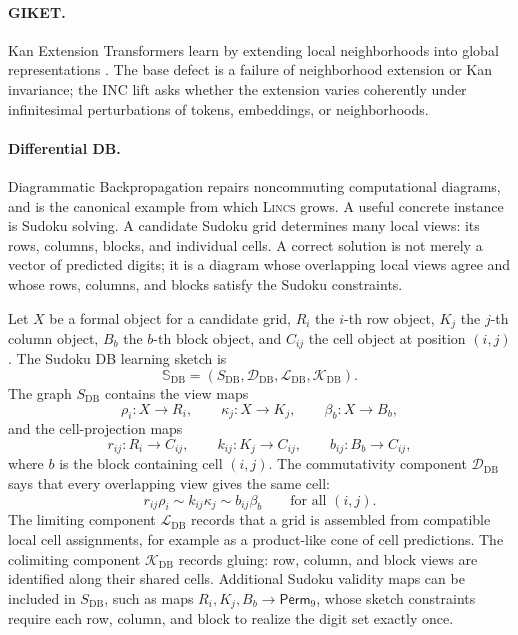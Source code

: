 \documentclass{article}
\begin{document}
\paragraph{GIKET.}
Kan Extension Transformers learn by extending local neighborhoods into global representations \citep{mahadevan2026ket}. The base defect is a failure of neighborhood extension or Kan invariance; the INC lift asks whether the extension varies coherently under infinitesimal perturbations of tokens, embeddings, or neighborhoods.

\paragraph{Differential DB.}
Diagrammatic Backpropagation repairs noncommuting computational diagrams, and is the canonical example from which \textsc{Lincs}   grows. A useful concrete instance is Sudoku solving. A candidate Sudoku grid determines many local views: its rows, columns, blocks, and individual cells. A correct solution is not merely a vector of predicted digits; it is a diagram whose overlapping local views agree and whose rows, columns, and blocks satisfy the Sudoku constraints.

Let \(X\) be a formal object for a candidate grid, \(R_i\) the \(i\)-th row object, \(K_j\) the \(j\)-th column object, \(B_b\) the \(b\)-th block object, and \(C_{ij}\) the cell object at position \((i,j)\). The Sudoku DB learning sketch is
\[
\mathbb S_{\mathrm{DB}}
  =
  (S_{\mathrm{DB}},
   \mathcal D_{\mathrm{DB}},
   \mathcal L_{\mathrm{DB}},
   \mathcal K_{\mathrm{DB}}).
\]
The graph \(S_{\mathrm{DB}}\) contains the view maps
\[
\rho_i:X\to R_i,\qquad
\kappa_j:X\to K_j,\qquad
\beta_b:X\to B_b,
\]
and the cell-projection maps
\[
r_{ij}:R_i\to C_{ij},\qquad
k_{ij}:K_j\to C_{ij},\qquad
b_{ij}:B_b\to C_{ij},
\]
where \(b\) is the block containing cell \((i,j)\). The commutativity component \(\mathcal D_{\mathrm{DB}}\) says that every overlapping view gives the same cell:
\[
r_{ij}\rho_i
\sim
k_{ij}\kappa_j
\sim
b_{ij}\beta_b
\qquad
\text{for all }(i,j).
\]
The limiting component \(\mathcal L_{\mathrm{DB}}\) records that a grid is assembled from compatible local cell assignments, for example as a product-like cone of cell predictions. The colimiting component \(\mathcal K_{\mathrm{DB}}\) records gluing: row, column, and block views are identified along their shared cells. Additional Sudoku validity maps can be included in \(S_{\mathrm{DB}}\), such as maps \(R_i,K_j,B_b\to \mathsf{Perm}_9\), whose sketch constraints require each row, column, and block to realize the digit set exactly once.
\end{document}
